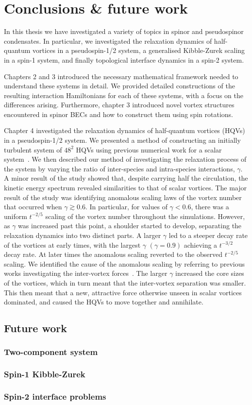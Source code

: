 \chapter{Conclusions \& future work}
In this thesis we have investigated a variety of topics in spinor and
pseudospinor condensates.
In particular, we investigated the relaxation dynamics of half-quantum vortices
in a pseudospin-1/2 system, a generalised Kibble-Zurek scaling in a spin-1
system, and finally topological interface dynamics in a spin-2 system.

Chapters 2 and 3 introduced the necessary mathematical framework needed to
understand these systems in detail.
We provided detailed constructions of the resulting interaction Hamiltonians for
each of these systems, with a focus on the differences arising.
Furthermore, chapter 3 introduced novel vortex structures encountered in spinor
BECs and how to construct them using spin rotations.

Chapter 4 investigated the relaxation dynamics of half-quantum vortices (HQVs)
in a pseudospin-1/2 system.
We presented a method of constructing an initially turbulent system of \(48^2\)
HQVs using previous numerical work for a scalar system~\cite{Billam2014}.
We then described our method of investigating the relaxation process of the
system by varying the ratio of inter-species and intra-species interactions,
\(\gamma \).
A minor result of the study showed that, despite carrying half the circulation,
the kinetic energy spectrum revealed similarities to that of scalar vortices.
The major result of the study was identifying anomalous scaling laws of the
vortex number that occurred when \(\gamma \gtrsim 0.6\).
In particular, for values of \(\gamma < 0.6\), there was a uniform \(t^{-2/5}\)
scaling of the vortex number throughout the simulations.
However, as \(\gamma \) was increased past this point, a shoulder started to
develop, separating the relaxation dynamics into two distinct parts.
A larger \(\gamma \) led to a steeper decay rate of the vortices at early times,
with the largest \(\gamma \) \((\gamma = 0.9)\) achieving a \(t^{-3/2}\) decay
rate.
At later times the anomalous scaling reverted to the observed \(t^{-2/5}\)
scaling.
We identified the cause of the anomalous scaling by referring to previous works
investigating the inter-vortex forces~\cite{Eto2011, Kasamatsu2016}.
The larger \(\gamma \) increased the core sizes of the vortices, which in turn
meant that the inter-vortex separation was smaller.
This then meant that a new, attractive force otherwise unseen in scalar
vortices dominated, and caused the HQVs to move together and annihilate.


\section{Future work}

\subsection{Two-component system}

\subsection{Spin-1 Kibble-Zurek}

\subsection{Spin-2 interface problems}

